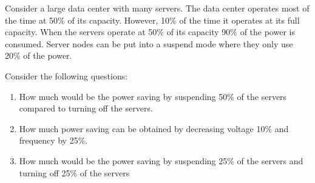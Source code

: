 \begin{acexercise}\end{acexercise}

Consider a large data center with many servers. The data center operates most of 
the time at 50\% of its capacity. However, 10\% of the time it operates at its
full capacity. When the servers operate at 50\% of its capacity 90\% of the power
is consumed. Server nodes can be put into a suspend mode where they only use
20\% of the power.

Consider the following questions:

\begin{enumerate}

\item How much would be the power saving by suspending 50\% of the servers
compared to turning off the servers.

\item How much power saving can be obtained by decreasing voltage 10\% and 
frequency by 25\%.

\item How much would be the power saving by suspending 25\% of the servers
and turning off 25\% of the servers

\end{enumerate}
